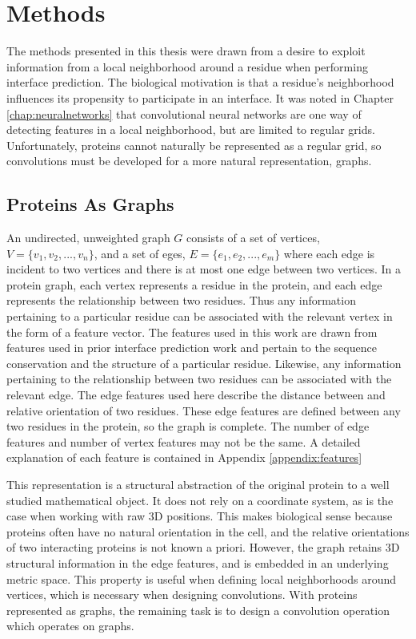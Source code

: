 \chapter{Methods}
\label{chap:methods}

The methods presented in this thesis were drawn from a desire to exploit information from a local neighborhood around a residue when performing interface prediction.
The biological motivation is that a residue's neighborhood influences its propensity to participate in an interface.
It was noted in Chapter \ref{chap:neuralnetworks} that convolutional neural networks are one way of detecting features in a local neighborhood, but are limited to regular grids. 
Unfortunately, proteins cannot naturally be represented as a regular grid, so convolutions must be developed for a more natural representation, graphs.


\section{Proteins As Graphs}

An undirected, unweighted graph $G$ consists of a set of vertices, $V=\{v_1, v_2, ..., v_n\}$, and a set of eges, $E=\{e_1, e_2, ..., e_m\}$ where each edge is incident to two vertices and there is at most one edge between two vertices.
In a protein graph, each vertex represents a residue in the protein, and each edge represents the relationship between two residues.
Thus any information pertaining to a particular residue can be associated with the relevant vertex in the form of a feature vector.
The features used in this work are drawn from features used in prior interface prediction work \cite{minhas2014} and pertain to the sequence conservation and the structure of a particular residue. 
Likewise, any information pertaining to the relationship between two residues can be associated with the relevant edge.
The edge features used here describe the distance between and relative orientation of two residues.
These edge features are defined between any two residues in the protein, so the graph is complete. 
The number of edge features and number of vertex features may not be the same.
A detailed explanation of each feature is contained in Appendix \ref{appendix:features}

This representation is a structural abstraction of the original protein to a well studied mathematical object.
It does not rely on a coordinate system, as is the case when working with raw 3D positions.
This makes biological sense because proteins often have no natural orientation in the cell, and the relative orientations of two interacting proteins is not known a priori.
However, the graph retains 3D structural information in the edge features, and is embedded in an underlying metric space.
This property is useful when defining local neighborhoods around vertices, which is necessary when designing convolutions.
With proteins represented as graphs, the remaining task is to design a convolution operation which operates on graphs. 

